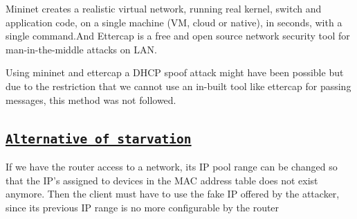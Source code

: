 \documentclass[12pt]{article}
\begin{document}
Mininet creates a realistic virtual network, running real kernel, switch and application code, on a single machine (VM, cloud or native), in seconds, with a single command.And Ettercap is a free and open source network security tool for man-in-the-middle attacks on LAN. 

Using mininet and ettercap a DHCP spoof attack might have been possible but due to the restriction that we cannot use an in-built tool like ettercap for passing messages, this method was not followed.


\subsection{\texttt{\underline{Alternative of starvation} }}

If we have the router access to a network, its IP pool range can be changed so that the IP's assigned to devices in the MAC address table does not exist anymore. Then the client must have to use the fake IP offered by the attacker, since its previous IP range is no more configurable by the router

\newpage
\end{document}
